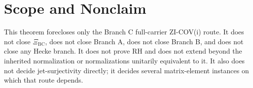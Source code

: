 \documentclass[11pt]{article}
\begin{document}
\section{Scope and Nonclaim}

This theorem forecloses only the Branch C full-carrier ZI-COV(i) route.  It
does not close \(\Xi_{\mathrm{BC}}\), does not close Branch A, does not close
Branch B, and does not close any Hecke branch.  It does not prove RH and does
not extend beyond the inherited normalization or normalizations unitarily
equivalent to it.  It also does not decide jet-surjectivity directly; it
decides several matrix-element instances on which that route depends.
\end{document}
